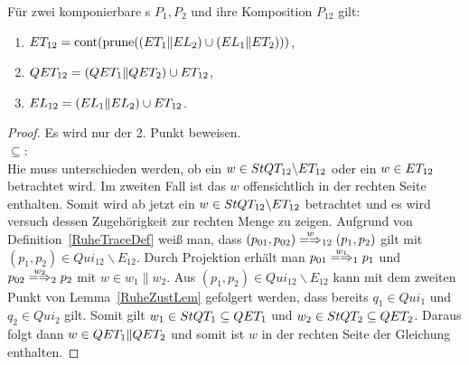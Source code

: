 \begin{Satz}
  \label{RuheSemSatz}
  Für zwei komponierbare \MEIO{}s $P_1,P_2$ und ihre Komposition $P_{12}$ gilt:
  \begin{enumerate}
    \item $ET _{12}=\mathrm{cont} (\mathrm{prune} ((ET _1\|EL _2)\cup (EL _1\|ET _2)))$,
    \item $QET _{12}=(QET _1\|QET _2)\cup ET _{12}$,
    \item $EL _{12}=(EL _1\|EL _2)\cup ET _{12}$.
  \end{enumerate}
\end{Satz}
\begin{proof}
  Es wird nur der 2. Punkt beweisen.\\
  \glqq$\subseteq$\grqq{}:\\
  Hie muss unterschieden werden, ob ein $w\in StQT _{12}\backslash ET _{12}$
  oder ein $w\in ET _{12}$ betrachtet wird. Im zweiten Fall ist das $w$
  offensichtlich in der rechten Seite enthalten. Somit wird ab jetzt ein
  $w\in StQT _{12}\backslash ET _{12}$ betrachtet und es wird versuch dessen
  Zugehörigkeit zur rechten Menge zu zeigen. Aufgrund von
  Definition~\ref{RuheTraceDef} weiß man, dass
  $(p_{01},p_{02})\weakmay[w]_{12}(p_1,p_2)$ gilt mit $(p_1,p_2)\in Qui_{12}
  \backslash E_{12}$. Durch Projektion erhält man $p_{01} \weakmay[w_1]_1
  p_1$ und $p_{02}\weakmay[w_2]_2p_2$ mit $w\in w_1\|w_2$. Aus $(p_1,p_2)\in
  Qui_{12}\backslash E_{12}$ kann mit dem zweiten Punkt von
  Lemma~\ref{RuheZustLem} gefolgert werden, dass bereits $q_1\in Qui_1$ und
  $q_2\in Qui_2$ gilt. Somit gilt $w_1\in StQT _1\subseteq QET _1$ und $w_2\in
  StQT _2\subseteq QET _2$. Daraus folgt dann $w\in QET _1\|QET _2$ und
  somit ist $w$ in der rechten Seite der Gleichung enthalten.


\end{proof}
